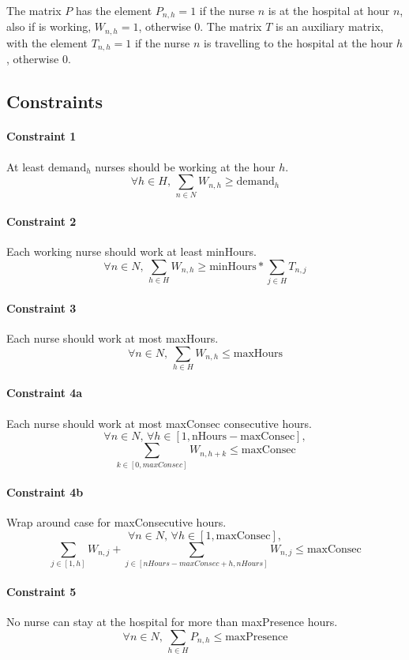 \documentclass[12pt,a4paper]{article}
\begin{document}
\noindent
The matrix $P$ has the element $P_{n,h} = 1$ if the nurse $n$ is at the hospital
at hour $n$, also if is working, $W_{n,h} = 1$, otherwise 0.
%
The matrix $T$ is an auxiliary matrix, with the element $T_{n,h} = 1$ if the
nurse $n$ is travelling to the hospital at the hour $h$, otherwise 0.

\subsection{Constraints}

\paragraph{Constraint 1} At least $\textrm{demand}_h$ nurses should be working
at the hour $h$.
$$ \forall h\in H,\, \sum_{n \in N} W_{n,h} \ge \textrm{demand}_h$$
%
\paragraph{Constraint 2} Each working nurse should work at least minHours.
$$ \forall n \in N,\, \sum_{h \in H} W_{n,h} \ge
  \textrm{minHours} * \sum_{j \in H} T_{n,j} $$
%
\paragraph{Constraint 3} Each nurse should work at most maxHours.
$$ \forall n \in N,\, \sum_{h \in H} W_{n,h} \le \textrm{maxHours} $$
%
\paragraph{Constraint 4a} Each nurse should work at most maxConsec consecutive
hours.
$$ \forall n \in N,\, \forall h \in [1, \textrm{nHours} - \textrm{maxConsec}],$$
$$\sum_{k \in [0, maxConsec]} W_{n, h+k} \le \textrm{maxConsec}
$$
%
\paragraph{Constraint 4b} Wrap around case for maxConsecutive hours.
$$ \forall n \in N,\, \forall h \in [1, \textrm{maxConsec}],$$
$$\sum_{j \in [1, h]} W_{n, j} +
  \sum_{j \in [nHours-maxConsec+h, nHours]} W_{n, j}  \le \textrm{maxConsec}
$$
%
\paragraph{Constraint 5} No nurse can stay at the hospital for more than
maxPresence hours.
$$ \forall n \in N, \, \sum_{h \in H} P_{n,h} \le \textrm{maxPresence} $$
%
\end{document}

